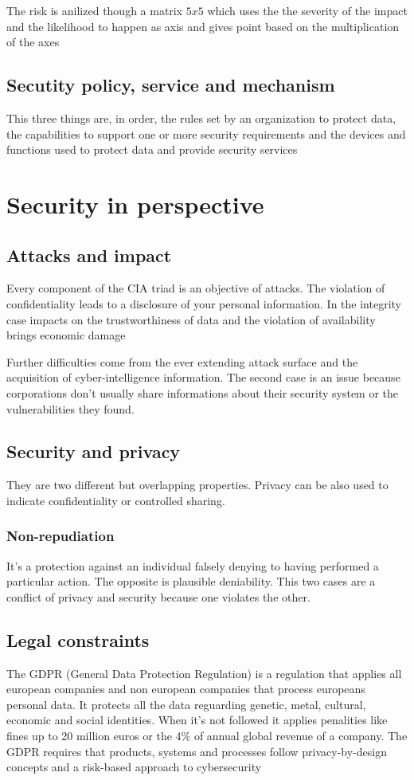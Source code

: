 \documentclass[12pt, a4paper]{article}
\begin{document}
The risk is anilized though a matrix $5x5$ which uses the the severity of the impact and the likelihood to happen as axis and gives point based on the
multiplication of the axes

\subsection{Secutity policy, service and mechanism}
This three things are, in order, the rules set by an organization to protect data, the capabilities to support one or more security requirements and the
devices and functions used to protect data and provide security services

\newpage
\section{Security in perspective}
\subsection{Attacks and impact}
Every component of the CIA triad is an objective of attacks. The violation of confidentiality leads to a disclosure of your personal
information. In the integrity case impacts on the trustworthiness of data and the violation of availability brings economic damage

Further difficulties come from the ever extending attack surface and the acquisition of cyber-intelligence information. The second case 
is an issue because corporations don't usually share informations about their security system or the vulnerabilities they found.

\subsection{Security and privacy}
They are two different but overlapping properties. Privacy can be also used to indicate confidentiality or controlled sharing.

\subsubsection*{Non-repudiation}
It's a protection against an individual falsely denying to having performed a particular action. The opposite is plausible 
deniability. This two cases are a conflict of privacy and security because one violates the other.

\subsection{Legal constraints}
The GDPR (General Data Protection Regulation) is a regulation that applies all european companies and non european companies
that process europeans personal data. It protects all the data reguarding genetic, metal, cultural, economic and social identities.
When it's not followed it applies penalities like fines up to 20 million euros or the 4\% of annual global revenue of a company.
The GDPR requires that products, systems and processes follow privacy-by-design concepts and a risk-based approach to cybersecurity 
\end{document}
